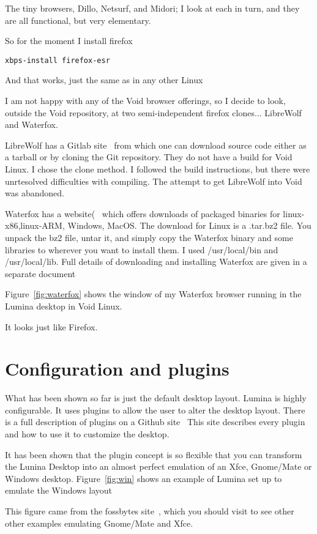 \documentclass{article}  %
\begin{document}
{The tiny browsers, Dillo, Netsurf, and Midori; I look at each in turn, and they are all functional, but very elementary. 

So for the moment I install firefox
\begin{verbatim}
xbps-install firefox-esr
\end{verbatim}
And that works, just the same as in any other Linux

I am not happy with any of the Void browser offerings, so I decide to look, outside the Void repository, at two semi-independent firefox clones... LibreWolf and Waterfox.

LibreWolf has a Gitlab site~\cite{libr:22} from which one can download source code either as a tarball or by  cloning the Git repository.  They do not have a build for Void Linux.  I chose the clone method. I followed the build instructions, but there were unrtesolved difficulties with compiling. The attempt to get LibreWolf  into Void was abandoned.

Waterfox has a website(~\cite{wate:22} which offers downloads of packaged binaries for linux-x86,linux-ARM, Windows, MacOS. The download for Linux is a .tar.bz2 file. You unpack the bz2 file, untar it, and simply copy the Waterfox binary and some libraries to wherever you want to install them. I used /usr/local/bin and /usr/local/lib. Full details of downloading and installing Waterfox are given in a separate document~\cite{waterfox:22}

Figure~\ref{fig:waterfox}  shows the window of my Waterfox browser running in the Lumina desktop in Void Linux. 

It looks just like Firefox.

\section{Configuration and plugins}
What has been  shown so far is just the default desktop layout.
Lumina is highly configurable. It uses plugins to allow the user to alter the desktop layout. There is a full description of plugins on a Github site~\cite{plug:22} This site describes every plugin and how to use it to customize the desktop.

It has been shown that the plugin concept is so flexible that you can transform the Lunina Desktop into an almost perfect emulation of an Xfce, Gnome/Mate or Windows desktop. Figure~\ref{fig:win} shows an example of Lumina set up to emulate the Windows layout

This figure came from the fossbytes site~\cite{tran:22}, which you should visit to see other other examples emulating Gnome/Mate and Xfce.

}
\end{document}
